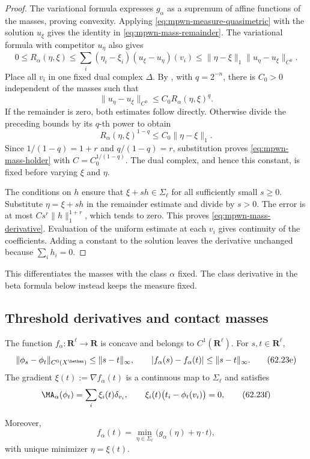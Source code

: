 \begin{proof}
The variational formula expresses $g_\alpha$ as a supremum of affine functions of the masses, proving convexity. Applying \eqref{eq:mpwn-measure-quasimetric} with the solution $u_\xi$ gives the identity in \eqref{eq:mpwn-mass-remainder}. The variational formula with competitor $u_\eta$ also gives
\[
 0\leq R_\alpha(\eta,\xi)
   \leq\sum_i(\eta_i-\xi_i)(u_\xi-u_\eta)(v_i)
   \leq\|\eta-\xi\|_1\|u_\eta-u_\xi\|_{C^0}.
\]
Place all $v_i$ in one fixed dual complex $\Delta$. By , with $q=2^{-n}$, there is $C_0>0$ independent of the masses such that
\[
 \|u_\eta-u_\xi\|_{C^0}
                   \leq C_0R_\alpha(\eta,\xi)^q.
\]
If the remainder is zero, both estimates follow directly. Otherwise divide the preceding bounds by its $q$-th power to obtain
\[
 R_\alpha(\eta,\xi)^{1-q}\leq C_0\|\eta-\xi\|_1.
\]
Since $1/(1-q)=1+r$ and $q/(1-q)=r$, substitution proves \eqref{eq:mpwn-mass-holder} with $C=C_0^{1/(1-q)}$. The dual complex, and hence this constant, is fixed before varying $\xi$ and $\eta$.

The conditions on $h$ ensure that $\xi+sh\in\Sigma_\ell$ for all sufficiently small $s\geq0$. Substitute $\eta=\xi+sh$ in the remainder estimate and divide by $s>0$. The error is at most $Cs^r\|h\|_1^{1+r}$, which tends to zero. This proves \eqref{eq:mpwn-mass-derivative}. Evaluation of the uniform estimate at each $v_i$ gives continuity of the coefficients. Adding a constant to the solution leaves the derivative unchanged because $\sum_i h_i=0$.
\end{proof}

This differentiates the masses with the class $\alpha$ fixed. The class derivative in the beta formula below instead keeps the measure fixed.

\subsection{Threshold derivatives and contact masses}
\label{subsec:mpwn-k-threshold-variation}

\begin{proposition}\label{prop:mpwn-threshold-derivative}
The function $f_\alpha:\mathbf R^\ell\to\mathbf R$ is concave and belongs to $C^1(\mathbf R^\ell)$. For $s,t\in\mathbf R^\ell$,
\[
 \|\phi_s-\phi_t\|_{C^0(X^{\bethan})}\leq\|s-t\|_\infty,
 \qquad |f_\alpha(s)-f_\alpha(t)|\leq\|s-t\|_\infty.
\tag{62.23e}\label{eq:mpwn-threshold-contraction}
\]
The gradient $\xi(t):=\nabla f_\alpha(t)$ is a continuous map to $\Sigma_\ell$ and satisfies
\[
 \MA_\alpha(\phi_t)=\sum_i\xi_i(t)\delta_{v_i},
 \qquad \xi_i(t)\bigl(t_i-\phi_t(v_i)\bigr)=0,
\tag{62.23f}\label{eq:mpwn-threshold-contact}
\]
\par\noindent\begin{minipage}{\linewidth}
Moreover,
\[
 f_\alpha(t)=\min_{\eta\in\Sigma_\ell}
                      \bigl(g_\alpha(\eta)+\eta\cdot t\bigr),
\tag{62.23g}\label{eq:mpwn-threshold-duality}
\]
with unique minimizer $\eta=\xi(t)$.
\end{minipage}\par
\end{proposition}

